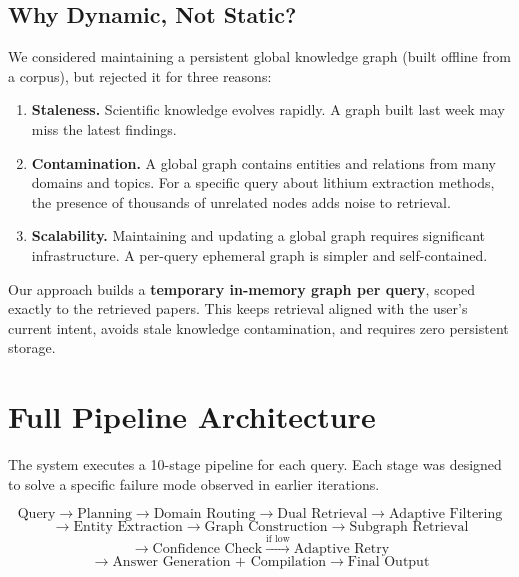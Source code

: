 \documentclass[11pt]{article}
\begin{document}
\subsection{Why Dynamic, Not Static?}

We considered maintaining a persistent global knowledge graph (built offline from a corpus), but rejected it for three reasons:

\begin{enumerate}[leftmargin=1.2em]
  \item \textbf{Staleness.} Scientific knowledge evolves rapidly. A graph built last week may miss the latest findings.
  \item \textbf{Contamination.} A global graph contains entities and relations from many domains and topics. For a specific query about lithium extraction methods, the presence of thousands of unrelated nodes adds noise to retrieval.
  \item \textbf{Scalability.} Maintaining and updating a global graph requires significant infrastructure. A per-query ephemeral graph is simpler and self-contained.
\end{enumerate}

Our approach builds a \textbf{temporary in-memory graph per query}, scoped exactly to the retrieved papers. This keeps retrieval aligned with the user's current intent, avoids stale knowledge contamination, and requires zero persistent storage.

\section{Full Pipeline Architecture}

The system executes a 10-stage pipeline for each query. Each stage was designed to solve a specific failure mode observed in earlier iterations.

\[
\text{Query} \rightarrow \text{Planning} \rightarrow \text{Domain Routing} \rightarrow \text{Dual Retrieval} \rightarrow \text{Adaptive Filtering}
\]
\[
\rightarrow \text{Entity Extraction} \rightarrow \text{Graph Construction} \rightarrow \text{Subgraph Retrieval}
\]
\[
\rightarrow \text{Confidence Check} \xrightarrow{\text{if low}} \text{Adaptive Retry}
\]
\[
\rightarrow \text{Answer Generation + Compilation} \rightarrow \text{Final Output}
\]

\end{document}
